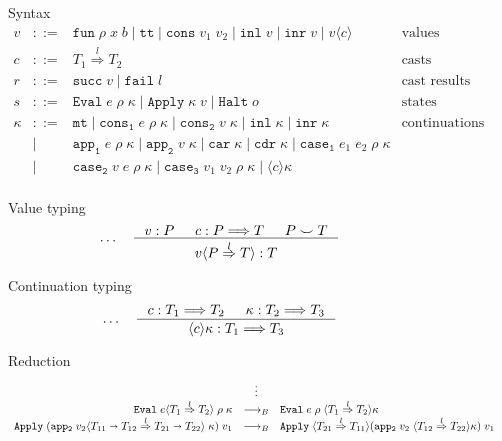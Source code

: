 \documentclass[acmsmall,review,anonymous]{acmart}\settopmatter{printfolios=true,printccs=false,printacmref=false}
\newcommand{\stxrule}[3]{#1 & ::= & #3 & \text{#2}\\}
\newcommand{\stxrulecont}[1]{& | & #1 & \\}
\newcommand{\redrule}[3]{#1 & \longrightarrow_B & #2 & #3\\}
\newcommand{\sOOinspect}[3]{\mathtt{Eval} \; #1 \; #2 \; #3}
\newcommand{\sOOreturn}[2]{\mathtt{Apply} \; #2 \; #1}
\newcommand{\sOOhalt}[1]{\mathtt{Halt} \; #1}
\newcommand{\POOfun}[2]{#1 \shortrightarrow #2}
\newcommand{\eOOcast}[4]{#1 \langle \cOOcast{#2}{#3}{#4} \rangle}
\newcommand{\cOOcast}[3]{#1 \overset{#2}{\Rightarrow} #3}
\newcommand{\vOOcast}[2]{#1\langle#2\rangle}
\newcommand{\vOOfun}[3]{\mathtt{fun} \; #1 \; #2 \; #3}
\newcommand{\vOOtt}[0]{\mathtt{tt}}
\newcommand{\vOOcons}[2]{\mathtt{cons}\;#1\;#2}
\newcommand{\vOOinl}[1]{\mathtt{inl}\;#1}
\newcommand{\vOOinr}[1]{\mathtt{inr}\;#1}
\newcommand{\rOOsucc}[1]{\mathtt{succ}\;#1}
\newcommand{\rOOfail}[1]{\mathtt{fail}\;#1}
\begin{document}
\begin{figure}
	Syntax
	\[
	\begin{array}{rclr}
	
	\stxrule{v}{values}{
		\vOOfun{\rho}{x}{b} \mid
		\vOOtt{} \mid
		\vOOcons{v_1}{v_2} \mid
		\vOOinl{v} \mid
		\vOOinr{v} \mid		
		\vOOcast{v}{c}
	}
	\stxrule{c}{casts}{
		\cOOcast{T_1}{l}{T_2}
	}
	\stxrule{r}{cast results}{
		\rOOsucc{v} \mid
		\rOOfail{l}
	}
	\stxrule{s}{states}{
		\sOOinspect{e}{\rho}{\kappa} \mid{}
		\sOOreturn{v}{\kappa} \mid{}
		\sOOhalt{o}
	}
		
	\stxrule{\kappa}{continuations}{
		\mathtt{mt} \mid{}
		\mathtt{cons_1} \; e \; \rho \; \kappa \mid{}
		\mathtt{cons_2} \; v \; \kappa \mid{}
		\mathtt{inl} \; \kappa \mid{}
		\mathtt{inr} \; \kappa
	}
	\stxrulecont{
		\mathtt{app_1} \; e \; \rho \; \kappa \mid{}
		\mathtt{app_2} \; v \; \kappa \mid{}
		\mathtt{car} \; \kappa \mid{}
		\mathtt{cdr} \; \kappa \mid
		\mathtt{case_1} \; e_1 \; e_2 \; \rho \; \kappa
	}
	\stxrulecont{	
		\mathtt{case_2} \; v   \; e   \; \rho \; \kappa \mid{}
		\mathtt{case_3} \; v_1 \; v_2 \; \rho \; \kappa \mid
		\langle c \rangle \kappa
	}
	\end{array}
	\]
	
	Value typing 
	\begin{gather*}
	\dots \quad
	\inference{
		v : P &
		c : P \Longrightarrow T &
		P \smile T
	}{
		\vOOcast{v}{\cOOcast{P}{l}{T}} : T
	}
	\end{gather*}
	
	Continuation typing 
	\begin{gather*}
	\dots \quad
	\inference{
		c : T_1 \Longrightarrow T_2 &
		\kappa : T_2 \Longrightarrow T_3
	}{
		\langle c \rangle \kappa : T_1 \Longrightarrow T_3
	}
	\end{gather*}
	
	Reduction 
	\[
	\begin{array}{rclr}
	
	& \vdots \\
	\redrule{
		\sOOinspect{\eOOcast{e}{T_1}{l}{T_2}}{\rho}{\kappa}
	}{
		\sOOinspect{e}{\rho}{\langle\cOOcast{T_1}{l}{T_2}\rangle\kappa}
	}{}
	\redrule{
		\sOOreturn{v_1}{(\mathtt{app_2} \; \vOOcast{v_2}{
				\cOOcast{\POOfun{T_{11}}{T_{12}}}{l}{\POOfun{T_{21}}{T_{22}}}
			} \; \kappa)}
	}{
		\sOOreturn{v_1}{
		\langle\cOOcast{T_{21}}{l}{T_{11}}\rangle
		(\mathtt{app_2} \; v_2 \; 
		\langle\cOOcast{T_{12}}{l}{T_{22}}\rangle \kappa)}
	}{}
	

\end{array}\]
\end{figure}
\end{document}
